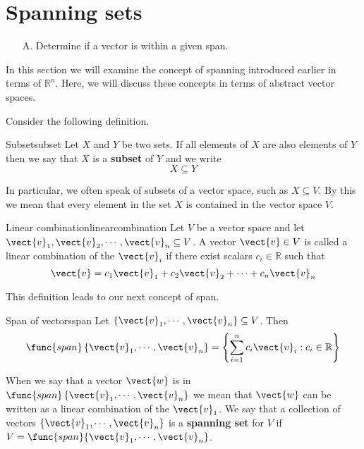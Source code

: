 \section{Spanning sets}

\begin{outcome}
\begin{enumerate}
\item[A.] Determine if a vector is within a given span.
\end{enumerate}
\end{outcome}

In this section we will examine the concept of spanning introduced earlier in terms of $\mathbb{R}^n$. Here, we will discuss these concepts in terms of abstract vector spaces. 

Consider the following definition. 

\begin{definition}{Subset}{subset}
Let $X$ and $Y$ be two sets. If all elements of $X$ are also elements of $Y$ then we say that $X$ is a \textbf{subset} of $Y$ and we write
\[
X \subseteq Y
\]
\end{definition}

In particular, we often speak of subsets of a vector space, such as $X \subseteq V$. By this we mean that every element in the set $X$ is contained in the vector space $V$. 

\begin{definition}{Linear combination}{linearcombination}
Let $V$ be a vector space and let $\vect{v}_1, \vect{v}_2, \cdots, \vect{v}_n \subseteq V$. A vector $\vect{v} \in V$ is called a linear combination of the $\vect{v}_i$ if there exist scalars $c_i \in \mathbb{R}$ such that 
\[
\vect{v} = c_1 \vect{v}_1 + c_2 \vect{v}_2 + \cdots + c_n \vect{v}_n
\]
\end{definition}

This definition leads to our next concept of span.

\begin{definition}{Span of vectors}{span}
Let $\{\vect{v}_{1},\cdots ,\vect{v}_{n}\} \subseteq V$. Then
\begin{equation*}
\func{span}\left\{ \vect{v}_{1},\cdots ,\vect{v}_{n}\right\} = 
\left\{ \sum_{i=1}^{n}c_{i}\vect{v}_{i}: c_{i}\in \mathbb{R}
\right\} 
\end{equation*}
\end{definition}

When we say that a vector $\vect{w}$ is in $\func{span}\left\{ \vect{v}_{1},\cdots ,\vect{v}_{n}\right\}$ we mean that $\vect{w}$ can be written as a linear combination of the $\vect{v}_1$. We say that a collection of vectors $\{\vect{v}_{1},\cdots ,\vect{v}_{n}\}$ is a \textbf{spanning set} for $V$ if $V = \func{span} \{\vect{v}_{1},\cdots ,\vect{v}_{n}\}$. 

